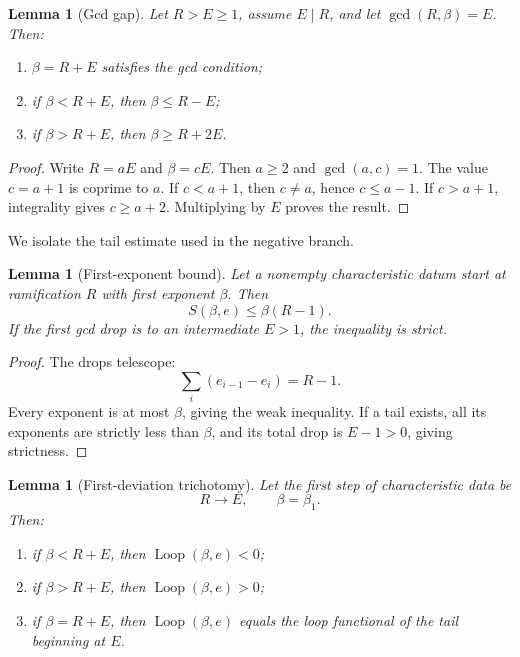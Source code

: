 \documentclass[11pt,a4paper]{amsart}
\theoremstyle{plain}
\newtheorem{lemma}[theorem]{Lemma}
\theoremstyle{definition}
\newcommand{\Loop}{\operatorname{Loop}}
\begin{document}
\begin{lemma}[Gcd gap]\label{lem:gcd-gap}
Let $R>E\ge1$, assume $E\mid R$, and let $\gcd(R,\beta)=E$.
Then:
\begin{enumerate}[label=(\roman*)]
\item $\beta=R+E$ satisfies the gcd condition;
\item if $\beta<R+E$, then $\beta\le R-E$;
\item if $\beta>R+E$, then $\beta\ge R+2E$.
\end{enumerate}
\end{lemma}

\begin{proof}
Write $R=aE$ and $\beta=cE$.  Then $a\ge2$ and $\gcd(a,c)=1$.  The value $c=a+1$ is coprime to
$a$.  If $c<a+1$, then $c\ne a$, hence $c\le a-1$.  If $c>a+1$, integrality gives $c\ge a+2$.
Multiplying by $E$ proves the result.
\end{proof}

We isolate the tail estimate used in the negative branch.

\begin{lemma}[First-exponent bound]\label{lem:tail-bound}
Let a nonempty characteristic datum start at ramification $R$ with first exponent $\beta$.
Then
\[
 S(\beta,e)\le \beta(R-1).
\]
If the first gcd drop is to an intermediate $E>1$, the inequality is strict.
\end{lemma}

\begin{proof}
The drops telescope:
\[
 \sum_i(e_{i-1}-e_i)=R-1.
\]
Every exponent is at most $\beta$, giving the weak inequality.  If a tail exists, all its
exponents are strictly less than $\beta$, and its total drop is $E-1>0$, giving strictness.
\end{proof}

\begin{lemma}[First-deviation trichotomy]\label{lem:first-deviation}
Let the first step of characteristic data be
\[
 R\longrightarrow E,\qquad \beta=\beta_1.
\]
Then:
\begin{enumerate}[label=(\roman*)]
\item if $\beta<R+E$, then $\Loop(\beta,e)<0$;
\item if $\beta>R+E$, then $\Loop(\beta,e)>0$;
\item if $\beta=R+E$, then $\Loop(\beta,e)$ equals the loop functional of the tail beginning at
$E$.
\end{enumerate}
\end{lemma}
\end{document}
